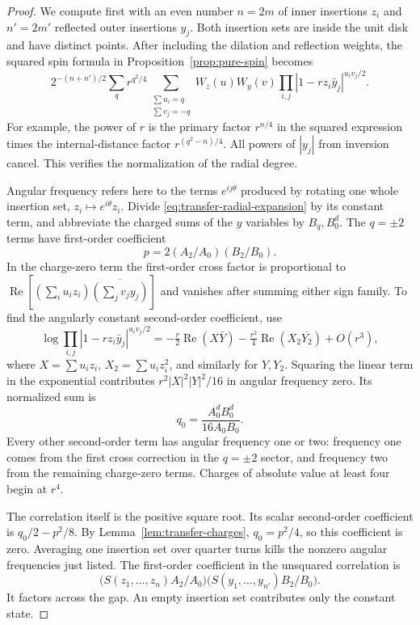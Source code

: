 \begin{proof}
We compute first with an even number $n=2m$ of inner insertions $z_i$
and $n'=2m'$ reflected outer insertions $y_j$.  Both insertion sets
are inside the unit disk and have distinct points.  After including
the dilation and reflection weights, the squared spin formula in
Proposition~\ref{prop:pure-spin} becomes
\begin{equation}
 2^{-(n+n')/2}\sum_q r^{q^2/4}
 \sum_{\substack{\sum u_i=q\\\sum v_j=-q}}
 W_z(u)W_y(v)
 \prod_{i,j}|1-rz_i\bar y_j|^{u_i v_j/2}.
 \label{eq:transfer-radial-expansion}
\end{equation}
For example, the power of $r$ is the primary factor $r^{n/4}$ in the
squared expression times the internal-distance factor
$r^{(q^2-n)/4}$.  All powers of $|y_j|$ from inversion cancel.
This verifies the normalization of the radial degree.

Angular frequency refers here to the terms $e^{ij\theta}$ produced by
rotating one whole insertion set, $z_i\mapsto e^{i\theta}z_i$.
Divide \eqref{eq:transfer-radial-expansion} by its constant term,
and abbreviate the charged sums of the $y$ variables by $B_q,B_0^d$.
The $q=\pm2$ terms have first-order coefficient
\[
 p=2(A_2/A_0)(B_2/B_0).
\]
In the charge-zero term the first-order cross factor is proportional
to
$\operatorname{Re}[(\sum_i u_i z_i)
\overline{(\sum_jv_j y_j)}]$ and vanishes after summing either sign
family.  To find the angularly constant second-order coefficient,
use
\[
 \log\prod_{i,j}|1-rz_i\bar y_j|^{u_iv_j/2}
 =-\tfrac r2\operatorname{Re}(X\bar Y)
   -\tfrac{r^2}{4}\operatorname{Re}(X_2\overline{Y_2})+O(r^3),
\]
where $X=\sum u_i z_i$, $X_2=\sum u_i z_i^2$, and similarly for
$Y,Y_2$.  Squaring the linear term in the exponential contributes
$r^2|X|^2|Y|^2/16$ in angular frequency zero.  Its normalized sum is
\[
 q_0=\frac{A_0^dB_0^d}{16A_0B_0}.
\]
Every other second-order term has angular frequency one or two: frequency
one comes from the first cross correction in the $q=\pm2$ sector, and
frequency two from the remaining charge-zero terms.  Charges of absolute
value at least four begin at $r^4$.

The correlation itself is the positive square root.  Its scalar
second-order coefficient is $q_0/2-p^2/8$.  By
Lemma~\ref{lem:transfer-charges}, $q_0=p^2/4$, so this coefficient
is zero.  Averaging one insertion set over quarter turns kills the
nonzero angular frequencies just listed.  The first-order coefficient
in the unsquared correlation is
\begin{equation}
 \bigl(S(z_1,\ldots,z_n)A_2/A_0\bigr)
 \bigl(S(y_1,\ldots,y_{n'})B_2/B_0\bigr).
 \label{eq:transfer-factorized-coefficient}
\end{equation}
It factors across the gap.  An empty insertion set contributes only
the constant state.


\end{proof}
